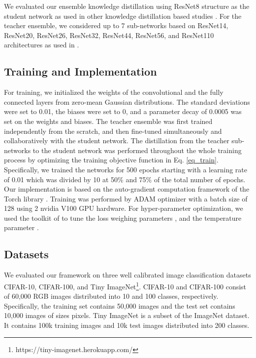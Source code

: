\documentclass{ecai}
\begin{document}
We evaluated our ensemble knowledge distillation using ResNet8 structure as the student network as used in other knowledge distillation based studies \cite{heo2018improving,mirzadeh2019improved}. For the teacher ensemble, we considered up to 7 sub-networks based on ResNet14, ResNet20, ResNet26, ResNet32, ResNet44, ResNet56, and ResNet110 architectures as used in  \cite{heo2018improving,mirzadeh2019improved}.
\subsection{Training and Implementation}
For training, we initialized the weights of the convolutional and the fully connected layers from zero-mean Gaussian distributions. The standard deviations were set to 0.01, the biases were set to 0, and a parameter decay of 0.0005 was set on the weights and biases. The teacher ensemble was first trained independently from the scratch, and then fine-tuned simultaneously and collaboratively with the student network. The distillation from the teacher sub-networks to the student network was performed throughout the whole training process by optimizing the training objective function in Eq. \ref{eq_train}.     
Specifically, we trained the networks for 500 epochs starting with a learning rate of 0.01 which was divided by 10 at 50\% and 75\% of the total number of epochs. 
Our implementation is based on the auto-gradient computation framework of the Torch library \cite{paszke2017automatic}. Training was performed by ADAM optimizer with a batch size of 128 using 2 nvidia V100 GPU hardware.
For hyper-parameter optimization, we used the toolkit of \cite{bergstra2011algorithms} to tune the loss weighing parameters , and the temperature parameter . 
\subsection{Datasets}
We evaluated our framework on three well calibrated image classification datasets CIFAR-10, CIFAR-100, and Tiny ImageNet\footnote{https://tiny-imagenet.herokuapp.com/}. CIFAR-10 and CIFAR-100 consist of 60,000 RGB images distributed into 10 and 100 classes, respectively. Specifically, the training set contains 50,000 images and the test set contains 10,000 images of sizes  pixels.
Tiny ImageNet is a subset of the ImageNet dataset. It contains 100k training images and 10k test images distributed into 200 classes. 
\end{document}
